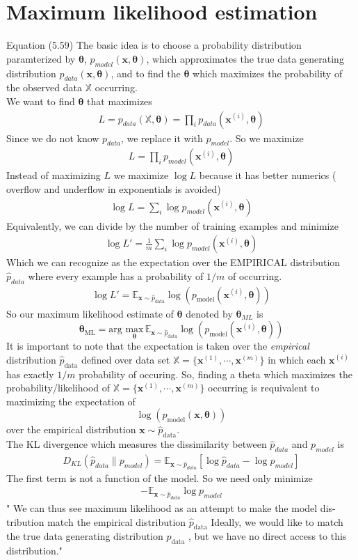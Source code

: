 \documentclass{article}
\newcommand{\beq}{\begin{equation}}
\newcommand{\eeq}{\end{equation}}
\newcommand{\ber}{\begin{eqnarray}}
\newcommand{\eer}{\end{eqnarray}}
\begin{document}
\section{\label{sect:mle}Maximum likelihood estimation}
Equation (5.59) The basic idea is to choose a probability distribution paramterized by $\pmb{\theta}$, $p_{model}(\pmb{x},\pmb{\theta})$, which approximates the true data generating distribution $p_{data}(\pmb{x},\pmb{\theta})$, and to find the $\pmb{\theta}$ which maximizes the probability of the observed data $\mathbb{X}$ occurring.\\
We want to find $\pmb{\theta}$ that maximizes
\ber
L = p_{data}(\mathbb{X},\pmb{\theta}) = \prod_i p_{data}(\pmb{x}^{(i)},\pmb{\theta})
\eer
Since we do not know $p_{data}$, we replace it with $p_{model}$. So we maximize
\ber
L = \prod_i p_{model}(\pmb{x}^{(i)},\pmb{\theta})
\eer
Instead of  maximizing $L$  we maximize $\log{L}$ because it has better numerics ( overflow and underflow in exponentials is avoided)\\
\ber
\log{L} = \sum_{i}\log{p_{model}}(\pmb{x}^{(i)},\pmb{\theta})
\eer
Equivalently, we can divide by the number of training examples and minimize
\ber
\log{L'}= \frac{1}{m}\sum_{i}\log{p_{model}}(\pmb{x}^{(i)},\pmb{\theta})
\eer
Which we can recognize as the expectation over the EMPIRICAL distribution $\hat{p}_{data}$ where every example has a probability of $1/m$ of occurring.
\ber
\log{L'} = \mathbb{E}_{\mathbf{x}\sim\hat{p}_{\text{data}}}\log(p_{\text{model}}(\pmb{x}^{(i)},\pmb{\theta}))
\eer
So our maximum likelihood estimate of $\pmb{\theta}$ denoted by $\pmb{\theta}_{ML}$ is 
\beq
\mathbf{\theta}_{\text{ML}} = \text{arg } \underset{\pmb{\theta}}{\text{max}} \, \mathbb{E}_{\mathbf{x}\sim\hat{p}_{\text{data}}}\log(p_{\text{model}}(\pmb{x}^{(i)},\pmb{\theta}))
\eeq
It is important to note that the expectation is taken over the \textit{empirical} distribution $\hat{p}_{\text{data}}$ defined over data set $\mathbb{X}=\{\pmb{x}^{(1)},\cdots,\pmb{x}^{(m)}\}$ in which each $\pmb{x}^{(i)}$ has exactly $1/m$ probability of occuring. So, finding a theta which maximizes the probability/likelihood of $\mathbb{X}=\{\pmb{x}^{(1)},\cdots,\pmb{x}^{(m)}\}$ occurring is requivalent to maximizing the expectation of
\beq
\log(p_{\text{model}}(\pmb{x},\pmb{\theta}))
\eeq
over the empirical distribution $\mathbf{x}\sim\hat{p}_{\text{data}}$.\\
%
The KL divergence which measures the dissimilarity between $\hat{p}_{data}$ and $p_{model}$ is
\ber
D_{KL}(\hat{p}_{data}\|p_{model}) = \mathbb{E}_{\pmb{x}\sim\hat{p}_{data}}[\log\hat{p}_{data}-\log{}p_{model}]
\eer
The first term is not a function of the model. So we need only minimize
\ber
-\mathbb{E}_{\pmb{x}\sim\hat{p}_{data}}\log{}p_{model}
\eer
" We can thus see maximum likelihood as an attempt to make the model dis-
tribution match the empirical distribution $\hat{p}_{\text{data}}$ Ideally, we would like to match
the true data generating distribution $p_{\text{data}}$ , but we have no direct access to this
distribution."\\
\end{document}
